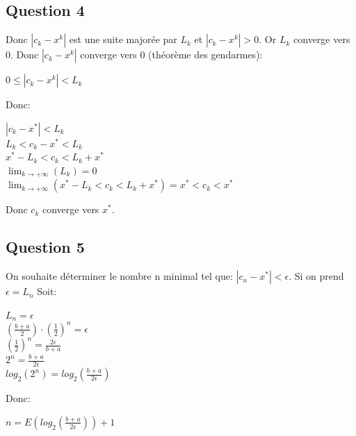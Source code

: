 \documentclass{article}
\begin{document}
	\subsection{Question 4}
	
	Donc $|c_{k}-x^{k}|$ est une suite majorée par $L_{k}$ et $|c_{k}-x^{k}| > 0$. Or $L_{k}$ converge vers 0. Donc $|c_{k}-x^{k}|$ converge vers 0 (théorème des gendarmes):
	
	\begin{center}
		\begin{large}
			$0 \le |c_{k}-x^{k}| < L_{k}$
		\end{large}
	\end{center}

	Donc:
	
	\begin{center}
		\begin{large}
			$|c_{k}-x^{*}| < L_{k}$\\
			$L_{k} < c_{k}-x^{*} < L_{k}$\\
			$x^{*}-L_{k} < c_{k} < L_{k}+x^{*}$\\
			$\lim_{k \to +\infty} (L_{k}) = 0$\\
			$\lim_{k \to +\infty} (x^{*}-L_{k} < c_{k} < L_{k}+x^{*}) = x^{*} < c_{k} < x^{*}$
		\end{large}
	\end{center}

	Donc $c_{k}$ converge vers $x^{*}$.

	\subsection{Question 5}
	
	On souhaite déterminer le nombre n minimal tel que: $|c_{n}-x^{*}|<\epsilon$. Si on prend $\epsilon = L_{n}$ Soit:	
	\begin{center}
		\begin{large}
			$L_{n} = \epsilon$\\
			$(\frac{b+a}{2}) \cdot (\frac{1}{2})^{n} = \epsilon$\\
			$(\frac{1}{2})^{n} = \frac{2 \epsilon}{b+a}$\\
			$2^{n} = \frac{b+a}{2 \epsilon}$\\
			$log_{2}(2^{n}) = log_{2}(\frac{b+a}{2 \epsilon})$\\
		\end{large}
	\end{center}
	
	Donc:
	
	\begin{center}
		\begin{large}
			$n = E(log_{2}(\frac{b+a}{2 \epsilon}))+1$
		\end{large}
	\end{center}
\end{document}

